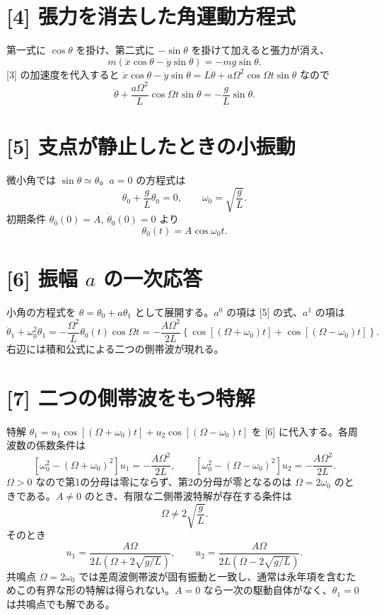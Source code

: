 \documentclass[11pt,a4paper]{article}
\begin{document}
\section*{[4] 張力を消去した角運動方程式}
第一式に $\cos\theta$ を掛け、第二式に $-\sin\theta$ を掛けて加えると張力が消え、
\[
m(\ddot x\cos\theta-\ddot y\sin\theta)=-mg\sin\theta.
\]
[3] の加速度を代入すると $\ddot x\cos\theta-\ddot y\sin\theta=L\ddot\theta+a\Omega^2\cos\Omega t\sin\theta$ なので
\[
\boxed{\ddot\theta+\frac{a\Omega^2}{L}\cos\Omega t\sin\theta=-\frac{g}{L}\sin\theta}.
\]

\section*{[5] 支点が静止したときの小振動}
微小角では $\sin\theta\simeq\theta$。$a=0$ の方程式は
\[
\ddot\theta_0+\frac gL\theta_0=0,\qquad \omega_0=\sqrt{\frac gL}.
\]
初期条件 $\theta_0(0)=A$, $\dot\theta_0(0)=0$ より
\[
\boxed{\theta_0(t)=A\cos\omega_0t}.
\]

\section*{[6] 振幅 $a$ の一次応答}
小角の方程式を $\theta=\theta_0+a\theta_1$ として展開する。$a^0$ の項は [5] の式、$a^1$ の項は
\[
\ddot\theta_1+\omega_0^2\theta_1=-\frac{\Omega^2}{L}\theta_0(t)\cos\Omega t
=-\frac{A\Omega^2}{2L}\left\{\cos[(\Omega+\omega_0)t]+\cos[(\Omega-\omega_0)t]\right\}.
\]
右辺には積和公式による二つの側帯波が現れる。

\section*{[7] 二つの側帯波をもつ特解}
特解 $\theta_1=u_1\cos[(\Omega+\omega_0)t]+u_2\cos[(\Omega-\omega_0)t]$ を [6] に代入する。各周波数の係数条件は
\[
\left[\omega_0^2-(\Omega+\omega_0)^2\right]u_1=-\frac{A\Omega^2}{2L},\qquad
\left[\omega_0^2-(\Omega-\omega_0)^2\right]u_2=-\frac{A\Omega^2}{2L}.
\]
$\Omega>0$ なので第1の分母は零にならず、第2の分母が零となるのは $\Omega=2\omega_0$ のときである。$A\ne0$ のとき、有限な二側帯波特解が存在する条件は
\[
\boxed{\Omega\ne2\sqrt{\frac gL}}.
\]
そのとき
\[
\boxed{u_1=\frac{A\Omega}{2L\left(\Omega+2\sqrt{g/L}\right)},\qquad
u_2=\frac{A\Omega}{2L\left(\Omega-2\sqrt{g/L}\right)}}.
\]
共鳴点 $\Omega=2\omega_0$ では差周波側帯波が固有振動と一致し、通常は永年項を含むためこの有界な形の特解は得られない。$A=0$ なら一次の駆動自体がなく、$\theta_1=0$ は共鳴点でも解である。
\end{document}
